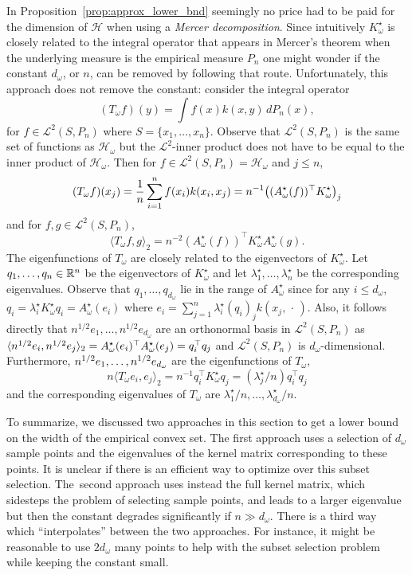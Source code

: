 \documentclass[10pt]{amsart}
\theoremstyle{definition}\newtheorem{defi}[theo]{Definition}\newtheorem{rema}[theo]{Remark}\newtheorem{exam}[theo]{Example}\newtheorem{exem}[theo]{Example}\newtheorem{nota}[theo]{Notation}
\theoremstyle{remark}
\newcommand{\R}{\mathbb{R}}
\newcommand{\cH}{\mathcal{H}}
\newcommand{\clL}{\mathcal{L}}
\let\originalleft\left
\let\originalright\right
\renewcommand{\left}{\mathopen{}\mathclose\bgroup\originalleft}
\renewcommand{\right}{\aftergroup\egroup\originalright}
\newcounter{setofstep}
\newcounter{step}[setofstep]
\begin{document}
In Proposition~\ref{prop:approx_lower_bnd} seemingly no price had to be paid for the dimension of $\cH$ when using a \emph{Mercer decomposition}. Since intuitively $K^\star_\omega$ is closely related to the integral operator that appears in Mercer's theorem when the underlying measure is the empirical measure $P_n$ one might wonder if the constant $d_\omega$, or $n$, can be removed by following that route. Unfortunately, this approach does not remove the constant: consider the integral operator
\[
(T_\omega f)(y) = \int f(x) k(x,y) \,dP_n(x),
\]
for $f \in \clL^2(S, P_n)$ where $S = \{x_1,\dots,x_n\}$. Observe that $\clL^2(S,P_n)$ is the same set of functions as $\cH_\omega$ but the $\clL^2$-inner product does not have to be equal to the inner product of $\cH_\omega$. Then for $f\in \clL^2(S,P_n) = \cH_\omega$ and $j\leq n$,
\[
(T_\omega f)(x_j) = \frac{1}{n} \sum_{i=1}^n f(x_i) k(x_i,x_j) = n^{-1} \left((A_\omega^\star(f))^\top K_\omega^\star\right)_j
\]
and for $f,g \in \clL^2(S,P_n)$,
\[
\langle T_\omega f,g \rangle_2 = n^{-2} (A_\omega^\star(f))^\top K_\omega^\star A_\omega^\star(g).
\]
The eigenfunctions of $T_\omega$ are closely related to the eigenvectors of $K_\omega^\star$. Let $q_1,\dots,\linebreak q_n \in \R^n$ be the eigenvectors of $K_\omega^\star$ and let $\lambda^\star_1,\dots, \lambda^\star_n$ be the corresponding eigenvalues. Observe that $q_1,\dots, q_{d_\omega}$ lie in the range of $A^\star_\omega$ since for any $i\leq d_\omega$, $q_i= \lambda^\star_i K_\omega^\star q_i = A_\omega^\star(e_i)$ where $e_i = \sum_{j=1}^n \lambda^\star_i (q_i)_j k(x_j,\,\cdot\,)$. Also, it follows directly that $n^{1/2} e_1,\dots,n^{1/2} e_{d_\omega}$ are an orthonormal basis in $\clL^2(S,P_n)$ as $\langle n^{1/2} e_i, n^{1/2} e_j\rangle_2 =\linebreak A_\omega^\star(e_i)^\top A_\omega^\star(e_j) = q_i^\top q_j$ and $\clL^2(S,P_n)$ is $d_\omega$-dimensional. Furthermore, $n^{1/2} e_1,\dots,\linebreak n^{1/2} e_{d_\omega}$ are the eigenfunctions of $T_\omega$,
\[
n \langle T_\omega e_i, e_j \rangle_2 = n^{-1} q_i^\top K_\omega^\star q_j = (\lambda_j^\star/n) q_i^\top q_j
\]
and the corresponding eigenvalues of $T_\omega$ are $\lambda^\star_1/n, \dots, \lambda_{d_\omega}^\star/n$.



To summarize, we discussed two approaches in this section to get a lower bound on the width of the empirical convex set. The first approach uses a selection of $d_\omega$ sample points and the eigenvalues of the kernel matrix corresponding to these points. It is unclear if there is an efficient way to optimize over this subset selection. The~second approach uses instead the full kernel matrix, which sidesteps the problem of selecting sample points, and leads to a larger eigenvalue but then the constant degrades significantly if $n \gg d_\omega$. There is a third way which ``interpolates'' between the two approaches. For instance, it might be reasonable to use $2 d_\omega$ many points to help with the subset selection problem while keeping the constant small.
\end{document}
